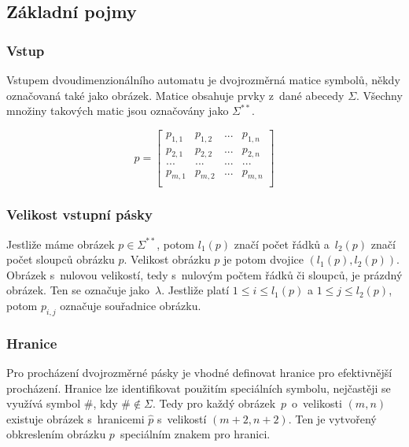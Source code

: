 \subsection{Základní pojmy}

\subsubsection{Vstup}

Vstupem dvoudimenzionálního automatu je dvojrozměrná matice symbolů, někdy
označovaná také jako obrázek. Matice obsahuje prvky z~dané abecedy \(\Sigma\).
Všechny množiny takových matic jsou označovány jako \(\Sigma^{**}\).

\[
    p = \begin{bmatrix}
        p_{1,1} & p_{1,2} & ... & p_{1,n} \\
        p_{2,1} & p_{2,2} & ... & p_{2,n} \\
        ...     & ...     & ... & ...     \\
        p_{m,1} & p_{m,2} & ... & p_{m,n} \\
    \end{bmatrix}
\]

\subsubsection{Velikost vstupní pásky}

Jestliže máme obrázek \(p \in \Sigma^{**}\), potom \(l_1(p)\) značí počet řádků
a~\(l_2(p)\) značí počet sloupců obrázku \(p\). Velikost obrázku \(p\) je potom
dvojice \((l_1(p), l_2(p))\). Obrázek s~nulovou velikostí, tedy s~nulovým
počtem řádků či sloupců, je prázdný obrázek. Ten se označuje jako~\(\lambda\).
Jestliže platí \(1 \leq i \leq l_1(p)\) a \(1 \leq j \leq l_2(p)\), potom
\(p_{i, j}\) označuje souřadnice obrázku.

\subsubsection{Hranice}

Pro procházení dvojrozměrné pásky je vhodné definovat hranice pro efektivnější
procházení. Hranice lze identifikovat použitím speciálních symbolu, nejčastěji
se využívá symbol \(\#\), kdy \(\# \notin \Sigma\). Tedy pro každý
obrázek~\(p\)~o~velikosti \((m, n)\) existuje obrázek s~hranicemi \(\hat{p}\)
s~velikostí \((m + 2, n + 2)\). Ten je vytvořený obkreslením obrázku
\(p\)~speciálním znakem pro hranici.

